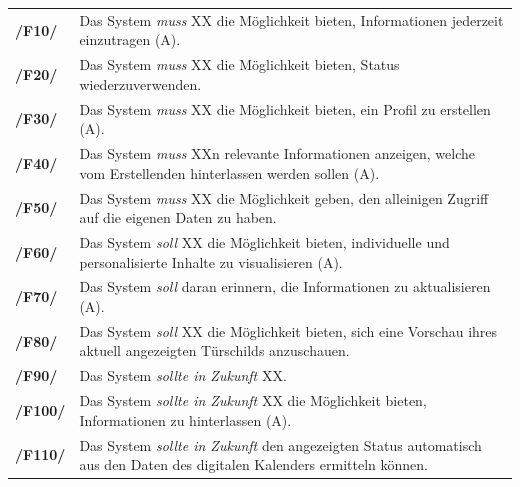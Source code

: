 \begin{center}
        \renewcommand{\arraystretch}{1.5}
        \begin{tabular}{p{}p{}}
                \hline
                \textbf{/F10/}  & Das System \textit{muss} XX die Möglichkeit
                bieten, Informationen jederzeit einzutragen (A).               \\
                \textbf{/F20/}  & Das System \textit{muss} XX die Möglichkeit
                bieten, Status wiederzuverwenden.                              \\
                \textbf{/F30/}  & Das System \textit{muss} XX die Möglichkeit
                bieten, ein Profil zu erstellen (A).                           \\
                \textbf{/F40/}  & Das System \textit{muss} XXn relevante
                Informationen anzeigen, welche vom Erstellenden hinterlassen
                werden sollen (A).                                             \\
                \textbf{/F50/}  & Das System \textit{muss} XX die Möglichkeit
                geben, den alleinigen Zugriff auf die eigenen Daten zu haben.  \\
                \textbf{/F60/}  & Das System \textit{soll} XX die Möglichkeit
                bieten, individuelle und personalisierte Inhalte zu
                visualisieren (A).                                             \\
                \textbf{/F70/}  & Das System \textit{soll} daran erinnern, die
                Informationen zu aktualisieren (A).                            \\
                \textbf{/F80/}  & Das System \textit{soll} XX die Möglichkeit
                bieten, sich eine Vorschau ihres aktuell angezeigten Türschilds
                anzuschauen.                                                   \\
                \textbf{/F90/}  & Das System \textit{sollte in Zukunft} XX.    \\
                \textbf{/F100/} & Das System \textit{sollte in Zukunft} XX die
                Möglichkeit bieten, Informationen zu hinterlassen (A).         \\
                \textbf{/F110/} & Das System \textit{sollte in Zukunft} den
                angezeigten Status automatisch aus den Daten des digitalen
                Kalenders ermitteln können.                                    \\
                \hline
        \end{tabular}
\end{center}


